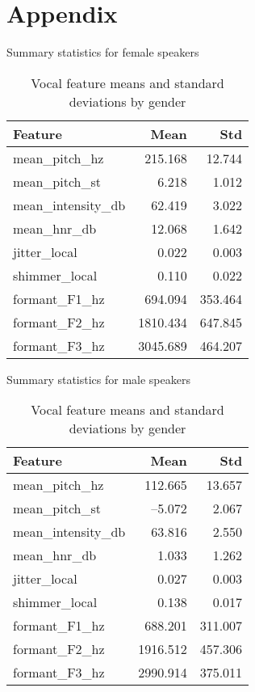 \newpage
\chapter*{Appendix}

\begin{table}[ht]
    \centering
    \begin{subtable}[t]{0.48\textwidth}
      \centering
      \caption{Summary statistics for female speakers}
      \label{tab:summary_female}
      \begin{tabular}{l r r}
        \toprule
        Feature               & Mean     & Std      \\
        \midrule
        mean\_pitch\_hz       & 215.168  & 12.744   \\
        mean\_pitch\_st       &   6.218  &  1.012   \\
        mean\_intensity\_db   &  62.419  &  3.022   \\
        mean\_hnr\_db         &  12.068  &  1.642   \\
        jitter\_local         &   0.022  &  0.003   \\
        shimmer\_local        &   0.110  &  0.022   \\
        formant\_F1\_hz       & 694.094  & 353.464  \\
        formant\_F2\_hz       & 1810.434 & 647.845  \\
        formant\_F3\_hz       & 3045.689 & 464.207  \\
        \bottomrule
      \end{tabular}
    \end{subtable}%
    \hfill
    \begin{subtable}[t]{0.48\textwidth}
      \centering
      \caption{Summary statistics for male speakers}
      \label{tab:summary_male}
      \begin{tabular}{l r r}
        \toprule
        Feature               & Mean     & Std      \\
        \midrule
        mean\_pitch\_hz       & 112.665  & 13.657   \\
        mean\_pitch\_st       &  –5.072  &  2.067   \\
        mean\_intensity\_db   &  63.816  &  2.550   \\
        mean\_hnr\_db         &   1.033  &  1.262   \\
        jitter\_local         &   0.027  &  0.003   \\
        shimmer\_local        &   0.138  &  0.017   \\
        formant\_F1\_hz       & 688.201  & 311.007  \\
        formant\_F2\_hz       & 1916.512 & 457.306  \\
        formant\_F3\_hz       & 2990.914 & 375.011  \\
        \bottomrule
      \end{tabular}
    \end{subtable}
    \caption{Vocal feature means and standard deviations by gender}
    \label{tab:summary_gender}
  \end{table}
  
